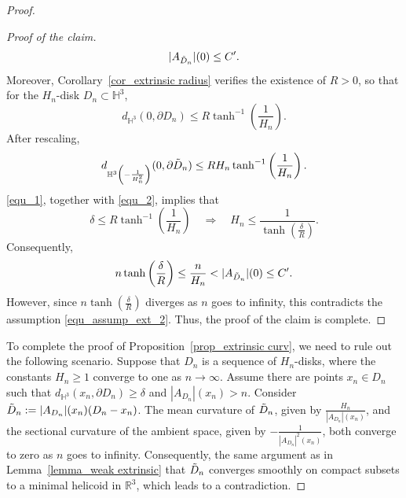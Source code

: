 \documentclass[10pt,a4paper]{amsart}
\begin{document}
\begin{proof}
\begin{proof}[Proof of the claim]
\begin{equation*}
    |A_{\Tilde{D}_n}|(0)\leq C'.
\end{equation*}
Moreover, Corollary~\ref{cor_extrinsic radius} verifies the existence of $R>0$, so that for the $H_n$-disk $D_n\subset \mathbb{H}^3$, \begin{equation*}
    d_{\mathbb{H}^3}(0,\partial D_n)\leq R \tanh^{-1}\left(\frac{1}{H_n}\right).
\end{equation*}
After rescaling, 
\begin{equation}\label{equ_2}
    d_{\mathbb{H}^3\left(-\frac{1}{H_n^2}\right)}(0,\partial \Tilde{D}_n)\leq RH_n \tanh^{-1}\left(\frac{1}{H_n}\right).
\end{equation}
\eqref{equ_1}, together with \eqref{equ_2}, implies that \begin{equation*}
    \delta\leq R\tanh^{-1}\left(\frac{1}{H_n}\right)\quad \Longrightarrow\quad H_n\leq \frac{1}{\tanh\left(\frac{\delta}{R}\right)}.
\end{equation*}
Consequently, \begin{equation*}
    n\tanh\left(\frac{\delta}{R}\right)\leq \frac{n}{H_n}<|A_{\Tilde{D}_n}|(0)\leq C'.
\end{equation*}
However, since $n\tanh\left(\frac{\delta}{R}\right)$ diverges as $n$ goes to infinity, this contradicts the assumption \eqref{equ_assump_ext_2}. Thus, the proof of the claim is complete.
\end{proof}

To complete the proof of Proposition~\ref{prop_extrinsic curv}, we need to rule out the following scenario. Suppose that $D_n$ is a sequence of $H_n$-disks, where the constants $H_n\geq 1$ converge to one as $n\rightarrow\infty$. Assume there are points $x_n\in D_n$ such that $d_{\mathbb{H}^3}(x_n,\partial D_n)\geq \delta$ and $|A_{D_n}|(x_n)>n$. Consider $\Tilde{D}_n:=|A_{D_n}|(x_n)(D_n-x_n)$. The mean curvature of $\Tilde{D}_n$, given by $\frac{H_n}{|A_{D_n}|(x_n)}$, and the sectional curvature of the ambient space, given by $-\frac{1}{|A_{D_n}|^2(x_n)}$, both converge to zero as $n$ goes to infinity. Consequently, the same argument as in Lemma~\ref{lemma_weak extrinsic} that $\Tilde{D}_n$ converges smoothly on compact subsets to a minimal helicoid in $\mathbb{R}^3$, which leads to a contradiction.
\end{proof}
\end{document}
